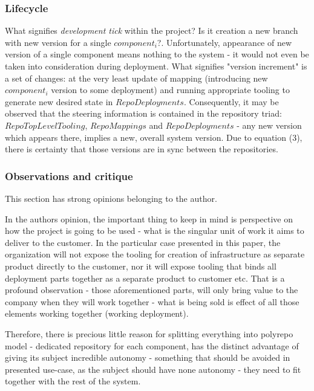 \documentclass{article}
\begin{document}
\subsubsection{Lifecycle}
What signifies \emph{development tick} within the project? Is it creation a new branch with new version for a single $component_i$?.
Unfortunately, appearance of new version of a single component means nothing to the system - it would not even be taken into consideration during deployment.
What signifies "version increment" is a set of changes: at the very least update of mapping (introducing new $component_i$ version to some deployment) and running appropriate tooling to generate new desired state in $RepoDeployments$.
Consequently, it may be observed that the steering information is contained in the repository triad: $RepoTopLevelTooling$, $RepoMappings$ and $RepoDeployments$ - any new version which appears there, implies a new, overall system version.
Due to equation (3), there is certainty that those versions are in sync between the repositories.

\subsubsection{Observations and critique}
\begin{warn}[Notice:]
	This section has strong opinions belonging to the author.
\end{warn}

In the authors opinion, the important thing to keep in mind is perspective on how the project is going to be used - what is the singular unit of work it aims to deliver to the customer.
In the particular case presented in this paper, the organization will not expose the tooling for creation of infrastructure as separate product directly to the customer, nor it will expose tooling that
binds all deployment parts together as a separate product to customer etc. That is a profound observation - those aforementioned parts, will only bring value to the company when they will work together - 
what is being sold is effect of all those elements working together (working deployment).

Therefore, there is precious little reason for splitting everything into polyrepo model - dedicated repository for each component, has
the distinct advantage of giving its subject incredible autonomy - something that should be avoided in presented use-case, as the subject should have none autonomy - they need to fit together with the rest of the system.
\end{document}

